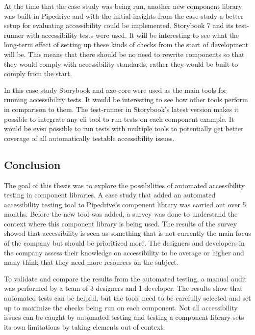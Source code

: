 \documentclass{master_thesis}
\begin{document}
At the time that the case study was being run, another new component library was built in Pipedrive and with the initial insights from the case study a better setup for evaluating accessibility could be implemented. Storybook 7 and its test-runner with accessibility tests were used. It will be interesting to see what the long-term effect of setting up these kinds of checks from the start of development will be. This means that there should be no need to rewrite components so that they would comply with accessibility standards, rather they would be built to comply from the start.

In this case study Storybook and axe-core were used as the main tools for running accessibility tests. It would be interesting to see how other tools perform in comparison to them. The test-runner in Storybook's latest version makes it possible to integrate any \ac{cli} tool to run tests on each component example. It would be even possible to run tests with multiple tools to potentially get better coverage of all automatically testable accessibility issues.

\subsection{Conclusion}

The goal of this thesis was to explore the possibilities of automated accessibility testing in component libraries. A case study that added an automated accessibility testing tool to Pipedrive's component library was carried out over 5 months.  Before the new tool was added, a survey was done to understand the context where this component library is being used. The results of the survey showed that accessibility is seen as something that is not currently the main focus of the company but should be prioritized more. The designers and developers in the company assess their knowledge on accessibility to be average or higher and many think that they need more resources on the subject.

To validate and compare the results from the automated testing, a manual audit was performed by a team of 3 designers and 1 developer. The results show that automated tests can be helpful, but the tools need to be carefully selected and set up to maximize the checks being run on each component. Not all accessibility issues can be caught by automated testing and testing a component library sets its own limitations by taking elements out of context.
\end{document}
